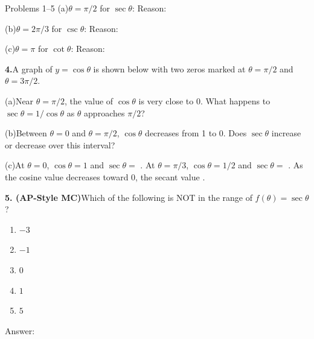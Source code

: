 \documentclass[10pt]{article}
\begin{document}
\begin{notesbox}{Problems 1--5}
\vspace{4pt}
(a)\quad $\theta = \pi/2$ for $\sec\theta$: \underline{\hspace{1.5cm}}
Reason: \writeline

\vspace{4pt}
(b)\quad $\theta = 2\pi/3$ for $\csc\theta$: \underline{\hspace{1.5cm}}
Reason: \writeline

\vspace{4pt}
(c)\quad $\theta = \pi$ for $\cot\theta$: \underline{\hspace{1.5cm}}
Reason: \writeline

\vspace{0.12in}
\textbf{4.}\quad A graph of $y = \cos\theta$ is shown below with two zeros marked
at $\theta = \pi/2$ and $\theta = 3\pi/2$.

\vspace{4pt}
(a)\quad Near $\theta = \pi/2$, the value of $\cos\theta$ is very close to 0.
What happens to $\sec\theta = 1/\cos\theta$ as $\theta$ approaches $\pi/2$?

\writeline

\vspace{4pt}
(b)\quad Between $\theta = 0$ and $\theta = \pi/2$, $\cos\theta$ decreases from
1 to 0. Does $\sec\theta$ increase or decrease over this interval?

\writeline

\vspace{4pt}
(c)\quad At $\theta = 0$, $\cos\theta = 1$ and $\sec\theta = $ \underline{\hspace{1.5cm}}.
At $\theta = \pi/3$, $\cos\theta = 1/2$ and $\sec\theta = $ \underline{\hspace{1.5cm}}.
As the cosine value decreases toward 0, the secant value \underline{\hspace{2.5cm}}.

\vspace{0.12in}
\textbf{5. (AP-Style MC)}\quad Which of the following is NOT in the range of
$f(\theta) = \sec\theta$?

\begin{enumerate}[label=(\Alph*), leftmargin=2em, itemsep=3pt]
  \item $-3$
  \item $-1$
  \item $0$
  \item $1$
  \item $5$
\end{enumerate}

Answer: \underline{\hspace{1.5cm}}

\end{notesbox}
\end{document}
